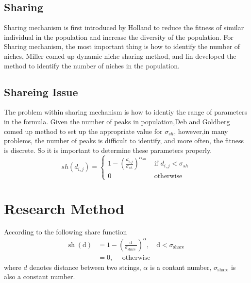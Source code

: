 \documentclass[smallextended]{svjour3}       %
\begin{document}
\begin{multicols}{2}
\begin{center}
\label{plot:GA}
\end{center}

\subsection{Sharing}
Sharing mechanism is first introduced by Holland \cite{miller1996genetic} to
reduce the fitness of similar individual in the population and increase the
diversity of the population. For Sharing mechanism, the most important thing is
how to identify the number of niches, Miller comed up dynamic niche sharing
method, and lin developed the method to identify the number of niches in the
population.\cite{lin2002niche}

\subsection{Shareing Issue}
The problem within sharing mechanism is how to identiy the range of parameters
in the formula. Given the number of peaks in population,Deb and Goldberg comed
up method to set up the appropriate value for $\sigma_{sh}$, however,in many
problems, the number of peaks is difficult to identify, and more often, the
fitness is discrete. So it is important to determine these parameters properly.
\begin{equation}
s h\left(d_{i, j}\right)=\left\{\begin{array}{ll}{1-\left(\frac{d_{i, j}}{\sigma_{s h}}\right)^{\alpha_{s h}}} 
    & {\text { if } d_{i, j}<\sigma_{s h}} \\ 
{0} & {\text { otherwise }}\end{array}\right.
\end{equation}




\section{Research Method}
According to the following share function
$$
\begin{aligned} 
\operatorname{sh}(\mathrm{d}) & = 1 - \left(\frac{\mathrm{d}}{\sigma_{\text {share }}}\right)^{\alpha}, 
                                  \quad \mathrm{d}<\sigma_{\text {share }} \\ 
                              & = 0, \quad \text { otherwise }
\end{aligned}
$$
where $d$ denotes distance between two strings, $\alpha$ is a contant number,
$\sigma_{\text {share}}$ is also a constant number.


\end{multicols}
\end{document}
